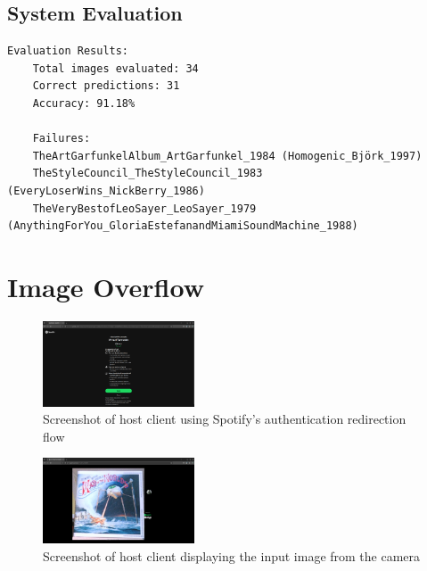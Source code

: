 \begin{uomappendix}
            \subsection{System Evaluation}
    
                \begin{adjustbox}{max width=\textwidth}
                    \begin{lstlisting}[caption={Ouroboros model evaluation results on 34 images}, label={lst:ourobEval}]
    Evaluation Results:
    Total images evaluated: 34
    Correct predictions: 31
    Accuracy: 91.18%
    
    Failures:
    TheArtGarfunkelAlbum_ArtGarfunkel_1984 (Homogenic_Björk_1997)
    TheStyleCouncil_TheStyleCouncil_1983 (EveryLoserWins_NickBerry_1986)
    TheVeryBestofLeoSayer_LeoSayer_1979 (AnythingForYou_GloriaEstefanandMiamiSoundMachine_1988)
                    \end{lstlisting}
                \end{adjustbox}
    
        \section{Image Overflow}
    
            \begin{figure}[h]
                \centering
                \includegraphics[width=0.4\textwidth]{images/screenshots/HOST_Auth.png}
                \caption{Screenshot of host client using Spotify's authentication redirection flow}
                \label{fig:hostAuth}
            \end{figure}
            
            \begin{figure}[h]
                \centering
                \includegraphics[width=0.4\textwidth]{images/screenshots/HOST_Cam.png}
                \caption{Screenshot of host client displaying the input image from the camera}
                \label{fig:hostCam}
            \end{figure}
            

\end{uomappendix}
